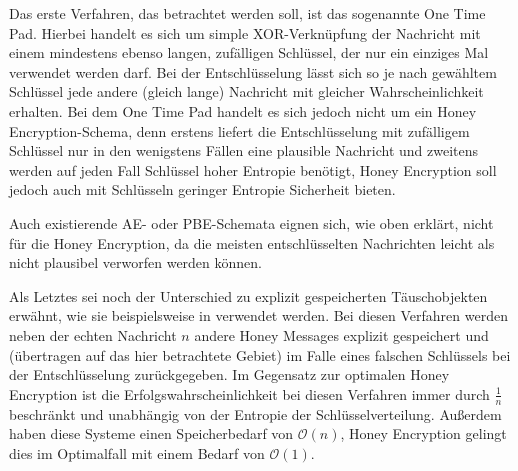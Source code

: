 Das erste Verfahren, das betrachtet werden soll, ist das sogenannte One Time Pad. Hierbei handelt es sich um simple XOR-Verknüpfung der Nachricht mit einem mindestens ebenso langen, zufälligen Schlüssel, der nur ein einziges Mal verwendet werden darf. Bei der Entschlüsselung lässt sich so je nach gewähltem Schlüssel jede andere (gleich lange) Nachricht mit gleicher Wahrscheinlichkeit erhalten. Bei dem One Time Pad handelt es sich jedoch nicht um ein Honey Encryption-Schema, denn erstens liefert die Entschlüsselung mit zufälligem Schlüssel nur in den wenigstens Fällen eine plausible Nachricht und zweitens werden auf jeden Fall Schlüssel hoher Entropie benötigt, Honey Encryption soll jedoch auch mit Schlüsseln geringer Entropie Sicherheit bieten.

Auch existierende AE- oder PBE-Schemata eignen sich, wie oben erklärt, nicht für die Honey Encryption, da die meisten entschlüsselten Nachrichten leicht als nicht plausibel verworfen werden können.

Als Letztes sei noch der Unterschied zu explizit gespeicherten Täuschobjekten erwähnt, wie sie beispielsweise in \cite{ACM13} verwendet werden. Bei diesen Verfahren werden neben der echten Nachricht \(n\) andere Honey Messages explizit gespeichert und (übertragen auf das hier betrachtete Gebiet) im Falle eines falschen Schlüssels bei der Entschlüsselung zurückgegeben. Im Gegensatz zur optimalen Honey Encryption ist die Erfolgswahrscheinlichkeit bei diesen Verfahren immer durch \(\frac{1}{n}\) beschränkt und unabhängig von der Entropie der Schlüsselverteilung. Außerdem haben diese Systeme einen Speicherbedarf von \(\mathcal{O}(n)\), Honey Encryption gelingt dies im Optimalfall mit einem Bedarf von \(\mathcal{O}(1)\).